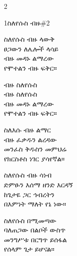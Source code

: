 \clearpage
\begin{multicols}{2}
\setlength{\columnseprule}{0.3pt}
\begin{hymn}{1}{ስለየሱስ ብዙ}{\#2}
\begin{stanza}
ስለየሱስ ብዙ ላውቅ\\
ፀጋውን ለሌሎች ላሳይ\\
ብዙ መዳኑ ልማረው\\
የሞተልን ብዙ ፍቅር።
\end{stanza}
\begin{chorus}
ብዙ ስለየሱስ\\
ብዙ ስለየሱስ\\
ብዙ መዳኑ ልማረው\\
የሞተልን ብዙ ፍቅር።
\end{chorus}
\begin{stanza}
ስለእሱ ብዙ ልማር\\
ብዙ ፈቃዱን ልረዳው\\
መንፈስ ቅዱስን መምህሬ\\
የክርስቶስ ነገር ያሳየኛል።
\end{stanza}
\begin{stanza}
ስለየሱስ ብዙ ሳነብ\\
ድምፁን እሰማ ዘንድ እርዳኝ\\
ከጌታዬ ጋር ኅብረትን\\
በእምነት ማለት የኔ ነው።
\end{stanza}
\begin{stanza}
ስለየሱስ በሚመጣው\\
ባለጠጋው በልቦች ውስጥ\\
መንግሥቱ በርግጥ ይሰፋል\\
የሰላም ጌታ ይሆናል።
\end{stanza}
\end{hymn}


\end{multicols}
